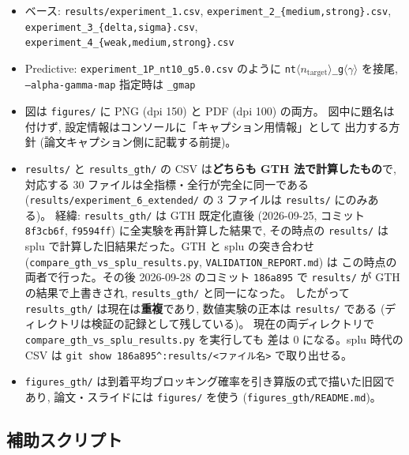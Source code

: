 \documentclass[a4paper,11pt]{article}
\newcommand{\code}[1]{\texttt{#1}}
\begin{document}
\begin{itemize}
  \item ベース: \code{results/experiment\_1.csv},
        \code{experiment\_2\_\{medium,strong\}.csv},
        \code{experiment\_3\_\{delta,sigma\}.csv},
        \code{experiment\_4\_\{weak,medium,strong\}.csv}
  \item Predictive: \code{experiment\_1P\_nt10\_g5.0.csv} のように
        \code{nt}$\langle n_{\mathrm{target}}\rangle$\code{\_g}$\langle\gamma\rangle$ を接尾, \code{--alpha-gamma-map}
        指定時は \code{\_gmap}
  \item 図は \code{figures/} に PNG (dpi 150) と PDF (dpi 100) の両方。
        図中に題名は付けず, 設定情報はコンソールに「キャプション用情報」として
        出力する方針 (論文キャプション側に記載する前提)。
  \item \code{results/} と \code{results\_gth/} の CSV は\textbf{どちらも GTH 法で計算したもの}で,
        対応する 30 ファイルは全指標・全行が完全に同一である
        (\code{results/experiment\_6\_extended/} の 3 ファイルは \code{results/} にのみある)。
        経緯: \code{results\_gth/} は GTH 既定化直後 (2026-09-25, コミット
        \code{8f3cb6f}, \code{f9594ff}) に全実験を再計算した結果で, その時点の
        \code{results/} は splu で計算した旧結果だった。GTH と splu の突き合わせ
        (\code{compare\_gth\_vs\_splu\_results.py}, \code{VALIDATION\_REPORT.md}) は
        この時点の両者で行った。その後 2026-09-28 のコミット \code{186a895} で
        \code{results/} が GTH の結果で上書きされ, \code{results\_gth/} と同一になった。
        したがって \code{results\_gth/} は現在は\textbf{重複}であり, 数値実験の正本は
        \code{results/} である (ディレクトリは検証の記録として残している)。
        現在の両ディレクトリで \code{compare\_gth\_vs\_splu\_results.py} を実行しても
        差は 0 になる。splu 時代の CSV は \code{git show 186a895\^{}:results/<ファイル名>}
        で取り出せる。
  \item \code{figures\_gth/} は到着平均ブロッキング確率を引き算版の式で描いた旧図であり,
        論文・スライドには \code{figures/} を使う (\code{figures\_gth/README.md})。
\end{itemize}

\subsection{補助スクリプト}
\end{document}
